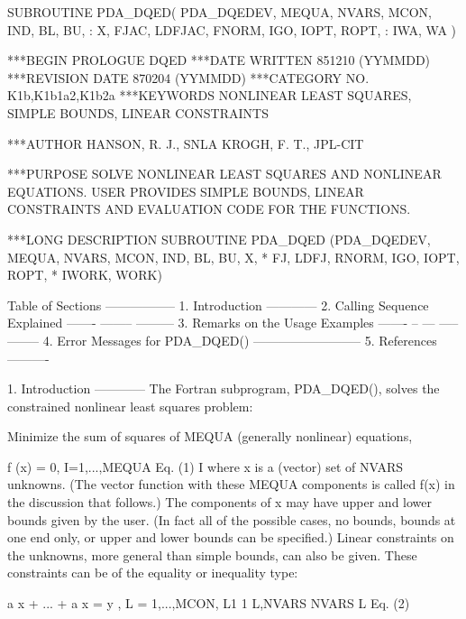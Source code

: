\documentclass[11pt,twoside,nolof]{starlink}
\begin{document}
\begin{terminalv}
      SUBROUTINE PDA_DQED( PDA_DQEDEV, MEQUA, NVARS, MCON, IND, BL, BU,
     :                     X, FJAC, LDFJAC, FNORM, IGO, IOPT, ROPT,
     :                     IWA, WA )

***BEGIN PROLOGUE  DQED
***DATE WRITTEN   851210   (YYMMDD)
***REVISION DATE  870204   (YYMMDD)
***CATEGORY NO. K1b,K1b1a2,K1b2a
***KEYWORDS  NONLINEAR LEAST SQUARES, SIMPLE BOUNDS,
             LINEAR CONSTRAINTS

***AUTHOR  HANSON, R. J., SNLA
           KROGH, F. T., JPL-CIT

***PURPOSE  SOLVE NONLINEAR LEAST SQUARES AND NONLINEAR
            EQUATIONS.  USER PROVIDES SIMPLE BOUNDS, LINEAR
            CONSTRAINTS AND EVALUATION CODE FOR THE FUNCTIONS.

***LONG DESCRIPTION
        SUBROUTINE PDA_DQED (PDA_DQEDEV, MEQUA, NVARS, MCON, IND, BL, BU, X,
       *            FJ, LDFJ, RNORM, IGO, IOPT, ROPT,
       *            IWORK, WORK)


  Table of Sections
  -----------------
  1. Introduction
     ------------
  2. Calling Sequence Explained
     ------- -------- ---------
  3. Remarks on the Usage Examples
     ------- -- --- ----- --------
  4. Error Messages for PDA_DQED()
     --------------------------
  5. References
     ----------

  1. Introduction
     ------------
  The Fortran subprogram, PDA_DQED(), solves the constrained nonlinear
  least squares problem:

  Minimize  the  sum  of  squares  of  MEQUA (generally nonlinear)
  equations,

       f (x) = 0, I=1,...,MEQUA                    Eq. (1)
        I
  where  x  is  a  (vector)  set  of  NVARS unknowns.  (The vector
  function  with  these  MEQUA  components  is  called f(x) in the
  discussion  that  follows.)   The components of x may have upper
  and  lower  bounds  given  by  the  user.   (In  fact all of the
  possible  cases, no bounds, bounds at one end only, or upper and
  lower  bounds  can  be  specified.)   Linear  constraints on the
  unknowns,  more  general than simple bounds,  can also be given.
  These constraints can be of the equality or inequality type:

       a  x + ... + a       x      =  y , L = 1,...,MCON,
        L1 1         L,NVARS NVARS     L
                                                   Eq. (2)


\end{terminalv}
\end{document}
